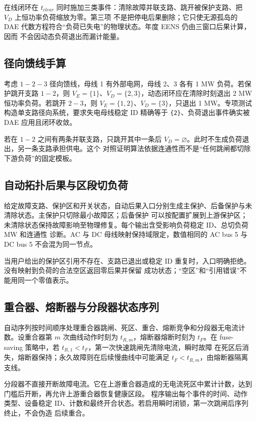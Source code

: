 在线闭环在 $t_{clear}$ 同时施加三类事件：清除故障并联支路、跳开被保护支路、把 $V_D$ 上恒功率负荷缩放为零。第三项
不是把停电后果删除；它只使无源孤岛的 DAE 代数方程符合“负荷已失电”的物理状态。年度 EENS 仍由三窗口后果计算，因而
不会因动态负荷退出而漏计能量。

\subsection{径向馈线手算}
考虑 $1-2-3$ 径向馈线，母线 1 有外部电网，母线 2、3 各有 1 MW 负荷。若保护跳开支路 $1-2$，则
$V_E=\{1\}$、$V_D=\{2,3\}$，动态闭环应在清除时刻退出 2 MW 恒功率负荷。若跳开 $2-3$，则
$V_E=\{1,2\}$、$V_D=\{3\}$，只退出 1 MW。专项测试构造单支路径向系统，要求失电母线稳定 ID 精确等于
\verb|{2}|、负荷退出事件确实被 DAE 应用且闭环收敛。

若在 $1-2$ 之间有两条并联支路，只跳开其中一条后 $V_D=\varnothing$。此时不生成负荷退出，另一条支路承担供电。这个
对照证明算法依据连通性而不是“任何跳闸都切除下游负荷”的固定模板。

\subsection{自动拓扑后果与区段切负荷}
给定故障支路、保护区和开关状态，自动后果入口分别生成主保护、后备保护与未清除状态。主保护只切除最小故障区；后备保护
可以按配置扩展到上游保护区；未清除状态保持故障影响至物理修复。每个输出含受影响负荷稳定 ID、总切负荷 MW 和连通性
诊断。AC 与 DC 母线映射保持域限定，数值相同的 AC bus 5 与 DC bus 5 不会混为同一节点。

当用户给出的保护区引用不存在、支路已退出或稳定 ID 重复时，入口明确拒绝。没有映射到负荷的合法空区返回零后果并保留
成功状态；“空区”和“引用错误”不能用同一个零值表示。

\subsection{重合器、熔断器与分段器状态序列}
自动序列按时间顺序处理重合器跳闸、死区、重合、熔断竞争和分段器无电流计数。设重合器第 $m$ 次曲线动作时刻为
$t_{R,m}$，熔断器熔断时刻为 $t_F$。在 fuse-saving 策略中，若 $t_{R,1}<t_F$，第一次快速跳闸先清除电流，瞬时故障
在死区后消失，熔断器保持；永久故障则在后续慢曲线中可能满足 $t_F<t_{R,m}$，由熔断器隔离支线。

分段器不直接开断故障电流。它在上游重合器造成的无电流死区中累计计数，达到门槛后开断，再允许上游重合器恢复健康区段。
程序输出每个事件的时间、动作类型、设备稳定 ID、计数和最终开合状态。若启用瞬时闭锁，第一次跳闸后序列终止，不会伪造
后续重合。

